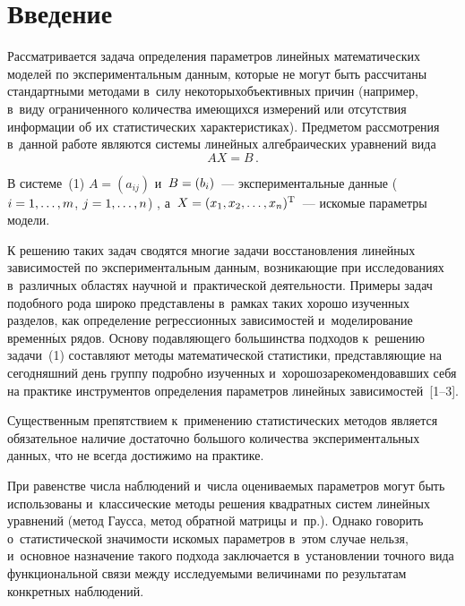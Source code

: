 



\thispagestyle{headings}

\begin{multicols}{2}

\label{st\stat}


\section{Введение}

  Рассматривается задача определения пара\-мет\-ров линейных математических
моделей по экспериментальным данным, которые не могут быть рассчитаны
стандартными методами в~силу некоторых\linebreak объективных причин (например,
в~виду ограни\-ченного количества имеющихся измерений или от\-сутствия
информации об их статистических характеристиках).
  Предметом рассмотрения в~данной \mbox{работе} являются системы линейных
алгебраических уравнений вида
  \begin{equation}
  AX=B\,.
  \label{e1-spi}
  \end{equation}

  В системе~(1) $A=(a_{ij})$ и~$B\hm=(b_i)$~--- экспериментальные данные
($i\hm= 1,\ldots, m$, $j\hm= 1,\ldots, n$) , а~$X\hm= (x_1, x_2, \ldots,
x_n)^{\mathrm{T}}$~--- искомые параметры мо\-дели.

  К решению таких задач сводятся многие задачи восстановления линейных
зависимостей по экспериментальным данным, возникающие при
исследованиях в~различных областях научной и~практической деятельности.
Примеры задач подобного рода широко представлены в~рамках таких хорошо
изученных разделов, как определение регрессионных зависимостей и~моделирование
временн$\acute{\mbox{ы}}$х рядов.
%
Основу подавляющего большинства
подходов к~решению задачи~(1) составляют методы математической
статистики, представляющие на сегодняшний день группу подробно изученных
и~хорошо\linebreak зарекомендовавших себя на практике инструментов определения
параметров линейных зависимостей~[1--3].

Существенным
препятствием к~применению статистических методов является {обязательное} наличие
достаточно большого количества экспериментальных данных, что не всегда
достижимо на практике.

При равенстве числа наблюдений и~числа
оцениваемых параметров могут быть использованы и~классические методы
решения квадратных систем линейных уравнений (метод Гаусса, метод
обратной матрицы и~пр.). Однако говорить о~статистической значимости
искомых параметров в~этом случае нельзя, и~основное назначение такого
подхода заключается в~установлении точного вида функциональной связи
между исследуемыми величинами по результатам конкретных наблюдений.


\end{multicols}
